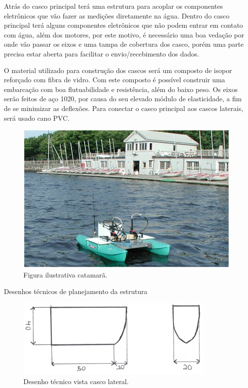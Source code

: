 Atrás do casco principal terá uma estrutura para acoplar os componentes eletrônicos que vão fazer as medições diretamente na água. Dentro do casco principal terá alguns componentes eletrônicos que não podem entrar em contato com água, além dos motores, por este motivo, é necessário uma boa vedação por onde vão passar os eixos e uma tampa de cobertura dos casco, porém uma parte precisa estar aberta para facilitar o envio/recebimento dos dados.

O material utilizado para construção dos cascos será um composto de isopor reforçado com fibra de vidro. Com este composto é possível construir uma embarcação com boa flutuabilidade e resistência, além do baixo peso. Os eixos serão feitos de aço 1020, por causa do seu elevado módulo de elasticidade, a fim de se minimizar as deflexões. Para conectar o casco principal aos cascos laterais, será usado cano PVC. 

 \begin{figure} [!htp]
	\centering
	\includegraphics[scale=0.7]{figuras/catamara}
	\caption{Figura ilustrativa catamarã.}
	\label{catamara}
\end{figure}
\FloatBarrier

Desenhos técnicos de planejamento da estrutura



\FloatBarrier
 \begin{figure} [!htp]
	\centering
	\includegraphics[scale=1]{figuras/roboat_cascolateral}
	\caption{Desenho técnico vista casco lateral.}
	\label{dtcl}
\end{figure}
\FloatBarrier



